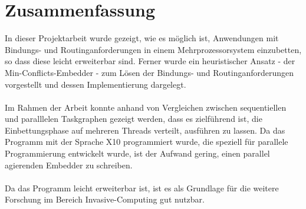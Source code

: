 \chapter{Zusammenfassung}\label{zusammenfassung}

In dieser Projektarbeit wurde gezeigt, wie es möglich ist, Anwendungen mit Bindungs- und Routinganforderungen in einem Mehrprozessorsystem einzubetten, so dass diese leicht erweiterbar sind. Ferner wurde ein heuristischer  Ansatz - der Min-Conflicts-Embedder - zum Lösen der Bindungs- und Routinganforderungen vorgestellt und dessen Implementierung dargelegt.\\
\\
Im Rahmen der Arbeit konnte anhand von Vergleichen zwischen sequentiellen und paralllelen Taskgraphen gezeigt werden, dass es zielführend ist, die Einbettungsphase auf mehreren Threads verteilt, ausführen zu lassen. Da das Programm mit der Sprache X10 programmiert wurde, die speziell für parallele Programmierung entwickelt wurde, ist der Aufwand gering, einen parallel agierenden Embedder zu schreiben.\\
\\
Da das Programm leicht erweiterbar ist, ist es als Grundlage für die weitere Forschung im Bereich Invasive-Computing \cite{invasiveComputing} gut nutzbar.

